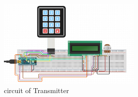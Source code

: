 \begin{figure}[htbp]
    \includegraphics[width=7cm, keepaspectratio]{figures/circuit_tx.png}
    \centering
    \caption{circuit of Transmitter}
    \label{fig:fig7}
\end{figure}
